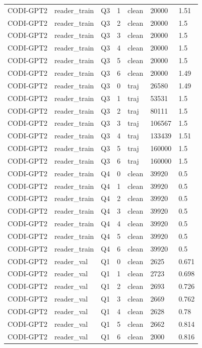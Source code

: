 \begin{longtable}{@{}p{}p{}p{}p{}p{}p{}p{}@{}}
CODI-GPT2 & reader\_train & Q3 & 1 & clean & 20000 & 1.51 \\
CODI-GPT2 & reader\_train & Q3 & 2 & clean & 20000 & 1.5 \\
CODI-GPT2 & reader\_train & Q3 & 3 & clean & 20000 & 1.5 \\
CODI-GPT2 & reader\_train & Q3 & 4 & clean & 20000 & 1.5 \\
CODI-GPT2 & reader\_train & Q3 & 5 & clean & 20000 & 1.5 \\
CODI-GPT2 & reader\_train & Q3 & 6 & clean & 20000 & 1.49 \\
CODI-GPT2 & reader\_train & Q3 & 0 & traj & 26580 & 1.49 \\
CODI-GPT2 & reader\_train & Q3 & 1 & traj & 53531 & 1.5 \\
CODI-GPT2 & reader\_train & Q3 & 2 & traj & 80111 & 1.5 \\
CODI-GPT2 & reader\_train & Q3 & 3 & traj & 106567 & 1.5 \\
CODI-GPT2 & reader\_train & Q3 & 4 & traj & 133439 & 1.51 \\
CODI-GPT2 & reader\_train & Q3 & 5 & traj & 160000 & 1.5 \\
CODI-GPT2 & reader\_train & Q3 & 6 & traj & 160000 & 1.5 \\
CODI-GPT2 & reader\_train & Q4 & 0 & clean & 39920 & 0.5 \\
CODI-GPT2 & reader\_train & Q4 & 1 & clean & 39920 & 0.5 \\
CODI-GPT2 & reader\_train & Q4 & 2 & clean & 39920 & 0.5 \\
CODI-GPT2 & reader\_train & Q4 & 3 & clean & 39920 & 0.5 \\
CODI-GPT2 & reader\_train & Q4 & 4 & clean & 39920 & 0.5 \\
CODI-GPT2 & reader\_train & Q4 & 5 & clean & 39920 & 0.5 \\
CODI-GPT2 & reader\_train & Q4 & 6 & clean & 39920 & 0.5 \\
CODI-GPT2 & reader\_val & Q1 & 0 & clean & 2625 & 0.671 \\
CODI-GPT2 & reader\_val & Q1 & 1 & clean & 2723 & 0.698 \\
CODI-GPT2 & reader\_val & Q1 & 2 & clean & 2693 & 0.726 \\
CODI-GPT2 & reader\_val & Q1 & 3 & clean & 2669 & 0.762 \\
CODI-GPT2 & reader\_val & Q1 & 4 & clean & 2628 & 0.78 \\
CODI-GPT2 & reader\_val & Q1 & 5 & clean & 2662 & 0.814 \\
CODI-GPT2 & reader\_val & Q1 & 6 & clean & 2000 & 0.816 \\

\end{longtable}
